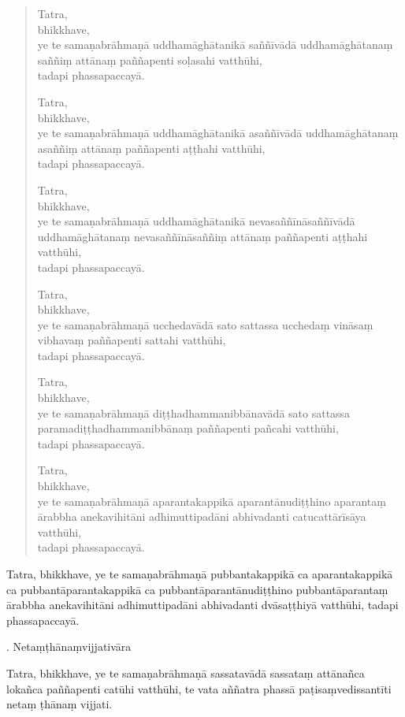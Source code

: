 \documentclass[11pt,twoside,openright]{book}
\begin{document}
\begin{verse}
Tatra,\\
\vin  bhikkhave,\\
\vin  ye te samaṇabrāhmaṇā uddhamāghātanikā saññīvādā uddhamāghātanaṃ saññiṃ attānaṃ paññapenti soḷasahi vatthūhi,\\
\vin  tadapi phassapaccayā.

Tatra,\\
\vin  bhikkhave,\\
\vin  ye te samaṇabrāhmaṇā uddhamāghātanikā asaññīvādā uddhamāghātanaṃ asaññiṃ attānaṃ paññapenti aṭṭhahi vatthūhi,\\
\vin  tadapi phassapaccayā.

Tatra,\\
\vin  bhikkhave,\\
\vin  ye te samaṇabrāhmaṇā uddhamāghātanikā nevasaññīnāsaññīvādā uddhamāghātanaṃ nevasaññīnāsaññiṃ attānaṃ paññapenti aṭṭhahi vatthūhi,\\
\vin  tadapi phassapaccayā.

Tatra,\\
\vin  bhikkhave,\\
\vin  ye te samaṇabrāhmaṇā ucchedavādā sato sattassa ucchedaṃ vināsaṃ vibhavaṃ paññapenti sattahi vatthūhi,\\
\vin  tadapi phassapaccayā.

Tatra,\\
\vin  bhikkhave,\\
\vin  ye te samaṇabrāhmaṇā diṭṭhadhammanibbānavādā sato sattassa paramadiṭṭhadhammanibbānaṃ paññapenti pañcahi vatthūhi,\\
\vin  tadapi phassapaccayā.

Tatra,\\
\vin  bhikkhave,\\
\vin  ye te samaṇabrāhmaṇā aparantakappikā aparantānudiṭṭhino aparantaṃ ārabbha anekavihitāni adhimuttipadāni abhivadanti catucattārīsāya vatthūhi,\\
\vin  tadapi phassapaccayā.

\end{verse}
\pstart
Tatra, bhikkhave, ye te samaṇabrāhmaṇā pubbantakappikā ca aparantakappikā ca pubbantāparantakappikā ca pubbantāparantānudiṭṭhino pubbantāparantaṃ ārabbha anekavihitāni adhimuttipadāni abhivadanti dvāsaṭṭhiyā vatthūhi, tadapi phassapaccayā.
\pend

. Netaṃṭhānaṃvijjativāra
\pend

\pstart
Tatra, bhikkhave, ye te samaṇabrāhmaṇā sassatavādā sassataṃ attānañca lokañca paññapenti catūhi vatthūhi, te vata aññatra phassā paṭisaṃvedissantīti netaṃ ṭhānaṃ vijjati.
\pend
\end{document}
